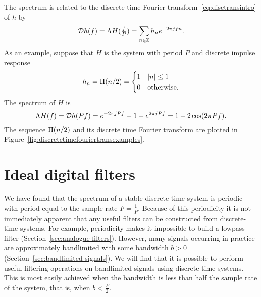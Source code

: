 The spectrum is related to the discrete time Fourier transform~\eqref{eq:disctransintro} of $h$ by
\[
{\mathcal D} h(f) = \Lambda H(\tfrac{f}{P}) =\sum_{n \in {\mathbb Z}} h_n e^{-2\pi j f n}.
\]
As an example, suppose that $H$ is the system with period $P$ and discrete impulse response
\[
h_n = \Pi(n/2) = \begin{cases}
1 & \left\vert n \right\vert \leq 1 \\
0 & \text{otherwise}.
\end{cases}
\]
The spectrum of $H$ is
\[
\Lambda H(f) = {\mathcal D} h(Pf) = e^{-2\pi j P f} + 1 + e^{2\pi j P f} = 1 + 2\cos(2\pi P f).
\]
The sequence $\Pi(n/2)$ and its discrete time Fourier transform are plotted in Figure~\ref{fig:discretetimefouriertransexamples}.
% 

\section{Ideal digital filters}\label{sec:ideal_digital_filters}

We have found that the spectrum of a stable discrete-time system is periodic with period equal to the sample rate $F = \tfrac{1}{P}$.  Because of this periodicity it is not immediately apparent that any useful filters can be constructed from discrete-time systems.  For example, periodicity makes it impossible to build a lowpass filter (Section~\ref{sec:analogue-filters}).  However, many signals occurring in practice are approximately bandlimited with some bandwidth $b > 0$ (Section~\ref{sec:bandlimited-signals}).  We will find that it is possible to perform useful filtering operations on bandlimited signals using discrete-time systems.  This is most easily achieved when the bandwidth is less than half the sample rate of the system, that is, when $b < \tfrac{F}{2}$.

